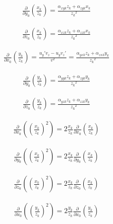 \begin{align}
\frac{\partial}{\partial y_0}\left(\frac{x_k}{z_k}\right) = \frac{\alpha_{xyk} z_k + \alpha_{zyk} x_k}{{z_k}^2}
\end{align}

\begin{align}
\frac{\partial}{\partial z_0}\left(\frac{x_k}{z_k}\right) = \frac{\alpha_{xzk} z_k + \alpha_{zzk} x_k}{{z_k}^2}
\end{align}




\begin{align}
\frac{\partial}{\partial x_0}\left(\frac{y_k}{z_k}\right) = \frac{{u_y}'v_z -u_y{v_z}'}{v^2}  = \frac{\alpha_{yxk} z_k + \alpha_{zxk} y_k}{{z_k}^2}
\end{align}

\begin{align}
\frac{\partial}{\partial y_0}\left(\frac{y_k}{z_k}\right) = \frac{\alpha_{yyk} z_k + \alpha_{zyk} y_k}{{z_k}^2}
\end{align}

\begin{align}
\frac{\partial}{\partial z_0}\left(\frac{y_k}{z_k}\right) = \frac{\alpha_{yzk} z_k + \alpha_{zzk} y_k}{{z_k}^2}
\end{align}




\begin{align}
\frac{\partial}{\partial x_0}\left(\left(\frac{x_k}{z_k}\right)^2\right) = 2 \frac{x_k}{z_k} \frac{\partial}{\partial x_0}\left(\frac{x_k}{z_k}\right)
\end{align}

\begin{align}
\frac{\partial}{\partial y_0}\left(\left(\frac{x_k}{z_k}\right)^2\right) = 2 \frac{x_k}{z_k} \frac{\partial}{\partial y_0}\left(\frac{x_k}{z_k}\right)
\end{align}

\begin{align}
\frac{\partial}{\partial z_0}\left(\left(\frac{x_k}{z_k}\right)^2\right) = 2 \frac{x_k}{z_k} \frac{\partial}{\partial z_0}\left(\frac{x_k}{z_k}\right)
\end{align}




\begin{align}
\frac{\partial}{\partial x_0}\left(\left(\frac{y_k}{z_k}\right)^2\right) = 2 \frac{y_k}{z_k} \frac{\partial}{\partial x_0}\left(\frac{y_k}{z_k}\right)
\end{align}

